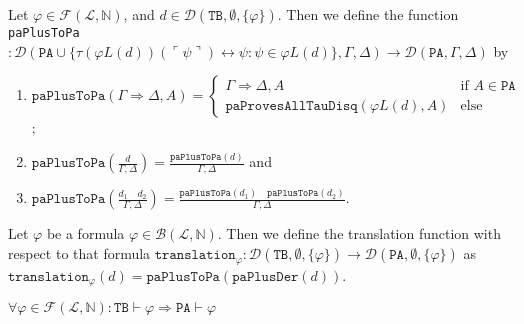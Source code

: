 \begin{definition}\label{def:PA-Plus-To-PA}
    \leanok
    Let $\varphi \in \mathcal{F}(\mathcal{L},\mathbb{N})$, and $d \in \mathcal{D}(\texttt{TB},\emptyset,\{\varphi\})$. Then we define the function \texttt{paPlusToPa}$: \mathcal{D}(\texttt{PA} \cup \{\tau(\varphi L(d))(\ulcorner \psi \urcorner) \leftrightarrow \psi : \psi \in \varphi L(d)\},\Gamma,\Delta) \to \mathcal{D}(\texttt{PA},\Gamma,\Delta)$ by
    \begin{enumerate}
    \item $\texttt{paPlusToPa}(\Gamma \Rightarrow \Delta, A) = \begin{cases}
        \Gamma \Rightarrow \Delta, A & \text{if } A \in \texttt{PA} \\
        \texttt{paProvesAllTauDisq}(\varphi L(d),A) & \text{else}
    \end{cases}$;
    \item $\texttt{paPlusToPa}(\frac{d}{\Gamma, \Delta}) = \frac{\texttt{paPlusToPa}(d)}{\Gamma, \Delta}$ and
    \item $\texttt{paPlusToPa}(\frac{d_1 \quad d_2}{\Gamma, \Delta}) = \frac{\texttt{paPlusToPa}(d_1) \quad \texttt{paPlusToPa}(d_2)}{\Gamma, \Delta}$.
    \end{enumerate}
\end{definition}

\begin{definition}[Translation]\label{def:Translation}
    \leanok
    Let $\varphi$ be a formula $\varphi \in \mathcal{B}(\mathcal{L},\mathbb{N})$. Then we define the translation function with respect to that formula $\texttt{translation}_{\varphi} : \mathcal{D}(\texttt{TB},\emptyset,\{\varphi\}) \to \mathcal{D}(\texttt{PA},\emptyset,\{\varphi\})$ as $\texttt{translation}_{\varphi}(d) = \texttt{paPlusToPa}(\texttt{paPlusDer}(d))$.
\end{definition}

\begin{theorem}\label{def:ConservativityTB}
    \leanok
    $\forall \varphi \in \mathcal{F}(\mathcal{L},\mathbb{N}) : \texttt{TB} \vdash \varphi \Rightarrow \texttt{PA} \vdash \varphi$
\end{theorem}

